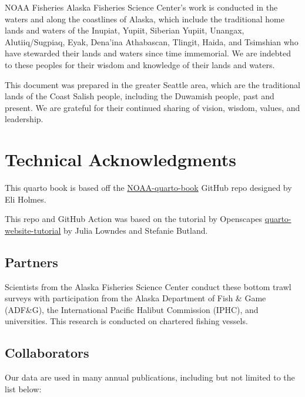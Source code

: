 \documentclass[
  letterpaper,
  oneside,
  open=any]{scrbook}
\begin{document}
NOAA Fisheries Alaska Fisheries Science Center's work is conducted in
the waters and along the coastlines of Alaska, which include the
traditional home lands and waters of the Inupiat, Yupiit, Siberian
Yupiit, Unangax, Alutiiq/Sugpiaq, Eyak, Dena'ina Athabascan, Tlingit,
Haida, and Tsimshian who have stewarded their lands and waters since
time immemorial. We are indebted to these peoples for their wisdom and
knowledge of their lands and waters.

This document was prepared in the greater Seattle area, which are the
traditional lands of the Coast Salish people, including the Duwamish
people, past and present. We are grateful for their continued sharing of
vision, wisdom, values, and leadership.

\chapter{Technical Acknowledgments}\label{technical-acknowledgments}

This quarto book is based off the
\href{https://github.com/nmfs-opensci/NOAA-quarto-book}{NOAA-quarto-book}
GitHub repo designed by Eli Holmes.

This repo and GitHub Action was based on the tutorial by Openscapes
\href{https://github.com/Openscapes/quarto-website-tutorial}{quarto-website-tutorial}
by Julia Lowndes and Stefanie Butland.

\section{Partners}\label{partners}

Scientists from the Alaska Fisheries Science Center conduct these bottom
trawl surveys with participation from the Alaska Department of Fish \&
Game (ADF\&G), the International Pacific Halibut Commission (IPHC), and
universities. This research is conducted on chartered fishing vessels.

\section{Collaborators}\label{collaborators}

Our data are used in many annual publications, including but not limited
to the list below:
\end{document}
